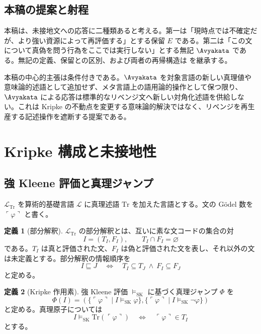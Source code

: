 \documentclass[11pt,a4paper]{article}
\theoremstyle{definition}
\newtheorem{definition}{定義}[section]
\theoremstyle{definition}
\newcommand{\Epoch}{E}
\newcommand{\Tr}{\mathrm{Tr}}
\newcommand{\Lang}{\mathcal{L}}
\begin{document}
\subsection{本稿の提案と射程}

本稿は、未接地文への応答に二種類あると考える。第一は「現時点では不確定だが、より強い資源によって再評価する」とする保留 $\Epoch$ である。第二は「この文について真偽を問う行為をここでは実行しない」とする無記 $\Avyakata$ である。無記の定義、保留との区別、および両者の再帰構造は \cite{ChibaAvyakata2026} を継承する。

本稿の中心的主張は条件付きである。$\Avyakata$ を対象言語の新しい真理値や意味論的述語として追加せず、メタ言語上の語用論的操作として保つ限り、$\Avyakata$ による応答は標準的なリベンジ文へ新しい対角化述語を供給しない。これは Kripke の不動点を変更する意味論的解決ではなく、リベンジを再生産する記述操作を遮断する提案である。

\section{Kripke 構成と未接地性}

\subsection{強 Kleene 評価と真理ジャンプ}

$\Lang_{\Tr}$ を算術的基礎言語 $\Lang$ に真理述語 $\Tr$ を加えた言語とする。文の Gödel 数を $\ulcorner\varphi\urcorner$ と書く。

\begin{definition}[部分解釈]
$\Lang_{\Tr}$ の部分解釈とは、互いに素な文コードの集合の対
\[
 I=(T_I,F_I),\qquad T_I\cap F_I=\varnothing
\]
である。$T_I$ は真と評価された文、$F_I$ は偽と評価された文を表し、それ以外の文は未定義とする。部分解釈の情報順序を
\[
 I\sqsubseteq J
 \quad\Longleftrightarrow\quad
 T_I\subseteq T_J\ \land\ F_I\subseteq F_J
\]
と定める。
\end{definition}

\begin{definition}[Kripke 作用素]
強 Kleene 評価 $\models_{\mathrm{SK}}$ に基づく真理ジャンプ $\Phi$ を
\[
 \Phi(I)=
 \left(
 \{\ulcorner\varphi\urcorner\mid I\models_{\mathrm{SK}}\varphi\},
 \{\ulcorner\varphi\urcorner\mid I\models_{\mathrm{SK}}\neg\varphi\}
 \right)
\]
と定める。真理原子については
\[
 I\models_{\mathrm{SK}}\Tr(\ulcorner\varphi\urcorner)
 \quad\Longleftrightarrow\quad
 \ulcorner\varphi\urcorner\in T_I
\]
とする。
\end{definition}
\end{document}
